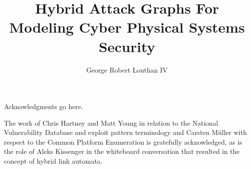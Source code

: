 \documentclass[12pt,letterpaper]{report}
\newif\iftestbox
\begin{document}
\iftestbox \testboxex \fi

%
%
\title{Hybrid Attack Graphs For Modeling Cyber Physical Systems Security}
\author{George Robert Louthan IV}

%
%
\coadvisorfalse  %

%
%


\numofpages{\pageref{LastPage}}                    %

%
%
\thesistrue  %

%
%

\copyrightfalse
\figurespagetrue   %
\tablespagetrue    %


\beforeabstract    %
\abstractp         %


%
%



\acknowledgementsp
%
%
Acknowledgments go here.

The work of Chris Hartney and Matt Young in relation to the National Vulnerability
Database and exploit pattern terminology and Carsten M\"{u}ller with respect to
the Common Platform Enumeration is gratefully acknowledged, as is the
role of Aleks Kissenger in the whiteboard conversation that resulted in the concept
of hybrid link automata.
\end{document}
